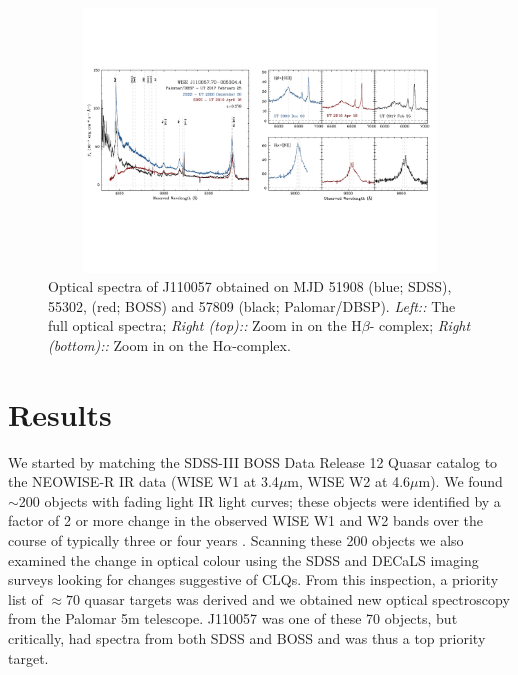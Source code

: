 \documentclass{nature}
\begin{document}
\begin{figure}
  \includegraphics[width=16.00cm, height=7.00cm, trim=0.0cm 0.0cm 0.0cm 0.0cm, clip]
  {../plots/spectra/J110057_spectra_wBalmers.pdf}
  \centering
  \caption[]{
Optical spectra of J110057 obtained on MJD 51908 (blue; SDSS), 55302,
(red; BOSS) and 57809 (black; Palomar/DBSP).  {\it Left::} The full
optical spectra; {\it Right (top)::} Zoom in on the H$\beta$-\oiii
complex; {\it Right (bottom)::} Zoom in on the H$\alpha$-\nii complex.
}
  \label{fig:J110057_spectra}
\end{figure}
\section{Results}  
We started by matching the SDSS-III BOSS Data Release 12 Quasar
catalog \cite[DR12Q; ][]{Paris2017} to the NEOWISE-R IR data (WISE W1
at 3.4$\mu$m, WISE W2 at 4.6$\mu$m). We found $\sim$200 objects with
fading light IR light curves; these objects were identified by a
factor of 2 or more change in the observed WISE W1 and W2 bands over
the course of typically three or four years \citep[see][and the
Supplemental Material for the detailed NEOWISE-R
selection]{Meisner2017b}. Scanning these 200 objects we also examined
the change in optical colour using the SDSS and DECaLS imaging surveys
looking for changes suggestive of CLQs. From this inspection, a
priority list of $\approx70$ quasar targets was derived and we
obtained new optical spectroscopy from the Palomar 5m telescope.
J110057 was one of these 70 objects, but critically, had spectra from
both SDSS and BOSS and was thus a top priority target.
\end{document}
